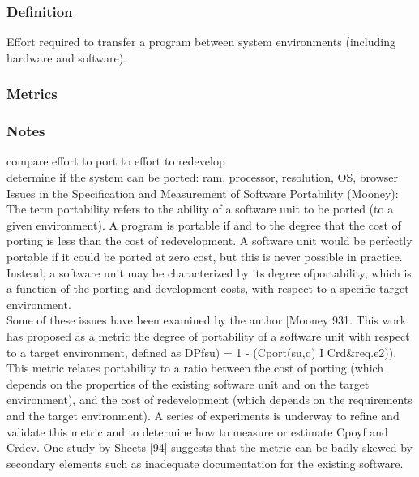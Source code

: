 \documentclass{article}
\begin{document}
\subsubsection{Definition}
Effort required to transfer a program between system environments (including hardware and software).\\
\subsubsection{Metrics}
\subsubsection{Notes}
compare effort to port to effort to redevelop\\ 

determine if the system can be ported: ram, processor, resolution, OS, browser\\ 

Issues in the Specification and Measurement of Software Portability (Mooney):\\
The term portability
 refers to the ability of a software
 unit to be ported (to a given environment).
 A program is
 portable if and to the degree that the cost of porting is less than
 the cost of redevelopment. A software unit would be perfectly
 portable if it could be ported at zero cost, but this is never
 possible in practice.
 Instead, a software unit may be
 characterized by its degree ofportability,
 which is a function of
 the porting and development costs, with respect to a specific
 target environment.\\   
 
 Some of these issues have been examined by the author
 [Mooney 931. This work has proposed as a metric the degree of
 portability
 of a software unit with respect to a target
 environment, defined as
 DPfsu) = 1 - (Cport(su,q) I Crd$\&$req.e2)).\\
 This metric relates portability to a ratio between the cost
 of porting (which depends on the properties of the existing
 software unit and on the target environment), and the cost of
 redevelopment (which depends on the requirements and the
 target environment). A series of experiments is underway to
 refine and validate this metric and to determine how to measure
 or estimate Cpoyf and Crdev.
 One study by Sheets [94]
 suggests that the metric can be badly skewed by secondary
 elements such as inadequate documentation for the existing
 software.\\
   
\end{document}
